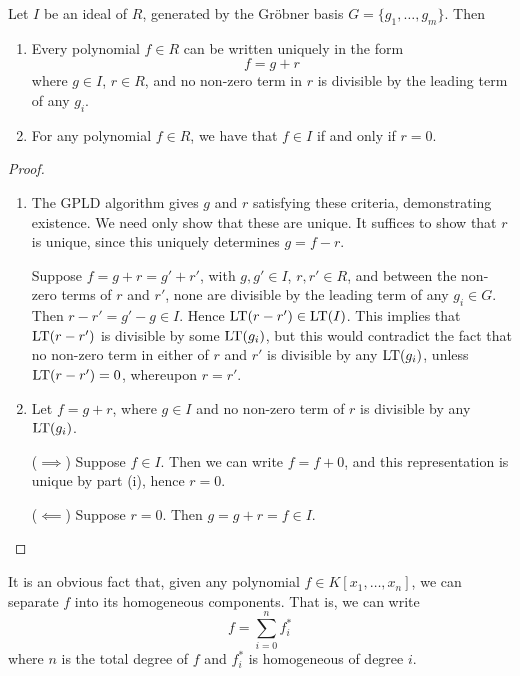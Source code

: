 \begin{theorem}
  \label{thm_groebner_basis_remainder}
  Let $I$ be an ideal of $R$, generated by the Gr\"obner basis $G = \{ g_1, \ldots, g_m \}$. Then
  \begin{enumerate}[label=(\roman*)]
    \item
    Every polynomial $f \in R$ can be written uniquely in the form
    \begin{equation*}
      f = g + r
    \end{equation*}
    where $g \in I$, $r \in R$, and no non-zero term in $r$ is divisible by the leading term of any $g_i$.
    
    \item
    For any polynomial $f \in R$, we have that $f \in I$ if and only if $r = 0$.
  \end{enumerate}
\end{theorem}
\begin{proof}
  \begin{enumerate}[label=(\roman*)]
    \item
    The GPLD algorithm gives $g$ and $r$ satisfying these criteria, demonstrating existence.
    We need only show that these are unique.
    It suffices to show that $r$ is unique, since this uniquely determines $g = f - r$.
    
    Suppose $f = g + r = g' + r'$, with $g, g' \in I$, $r, r' \in R$, and between the non-zero terms of $r$ and $r'$,
    none are divisible by the leading term of any $g_i \in G$.
    Then $r - r' = g' - g \in I$.
    Hence $\operatorname{LT}(r - r') \in \operatorname{LT}(I)$.
    This implies that $\operatorname{LT}(r - r')$ is divisible by some $\operatorname{LT}(g_i)$,
    but this would contradict the fact that no non-zero term in either of $r$ and $r'$ is divisible by any $\operatorname{LT}(g_i)$,
    unless $\operatorname{LT}(r - r') = 0$, whereupon $r = r'$.
    
    \item
    Let $f = g + r$, where $g \in I$ and no non-zero term of $r$ is divisible by any $\operatorname{LT}(g_i)$.

    ($\implies$)
    Suppose $f \in I$.
    Then we can write $f = f + 0$, and this representation is unique by part (i), hence $r = 0$.

    ($\impliedby$)
    Suppose $r = 0$.
    Then $g = g + r = f \in I$.
  \end{enumerate}
\end{proof}

It is an obvious fact that, given any polynomial $f \in K[x_1, \ldots, x_n]$,
we can separate $f$ into its homogeneous components.
That is, we can write
\[ f = \sum_{i = 0}^n f_i^* \]
where $n$ is the total degree of $f$ and $f_i^*$ is homogeneous of degree $i$.

